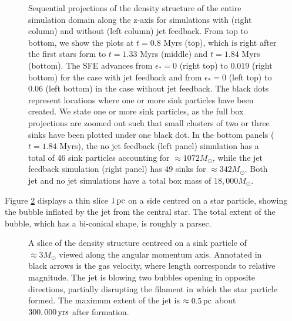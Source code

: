 \documentclass[../dissertation.tex]{subfiles}
\begin{document}
%
\begin{figure}[htb] %
  \caption[Jet - Jet No Jet Comparison]{Sequential projections of the density structure of the entire simulation domain along the z-axis for simulations with (right column) and without (left column) jet feedback.  From top to bottom, we show the plots at $t=0.8$ Myrs (top), which is right after the first stars form to $t=1.33$ Myrs (middle) and $t=1.84$ Myrs (bottom).  The SFE advances from $\epsilon_* = 0$ (right top) to $0.019$ (right bottom) for the case with jet feedback and from $\epsilon_* = 0$ (left top) to $0.06$ (left bottom) in the case without jet feedback. The black dots represent locations where one or more sink particles have been created. We state one or more sink particles, as the full box projections are zoomed out such that small clusters of two or three sinks have been plotted under one black dot. 
In the bottom panels ($t = 1.84$ Myrs), the no jet feedback (left panel) simulation has a total of 46 sink particles accounting for $\approx 1072 M_\odot$, while the jet feedback simulation (right panel) has 49 sinks for $\approx 342 M_\odot$. Both jet and no jet simulations have a total box mass of $18,000 M_\odot$.}
    \label{fig:jet_jet_panel}
\end{figure}
%

Figure \ref{fig:jet_jet_close_up} displays a thin slice $1\,{\rm pc}$ on a side centred on a star particle, showing the bubble inflated by the jet from the central star.
The total extent of the bubble, which has a bi-conical shape, is roughly a parsec.

%
\begin{figure}[htb] %
  \caption[Jet - Postage stamp of jet blown gas]{A slice of the density structure centreed on a sink particle of $\approx 3 M_\odot$ viewed along the angular momentum axis. Annotated in black arrows is the gas velocity, where length corresponds to relative magnitude. The jet is blowing two bubbles opening in opposite directions, partially disrupting the filament in which the star particle formed. The maximum extent of the jet is $\approx 0.5 \, {\rm pc}$ about $300,000 \, {\rm yrs}$ after formation.}
    \label{fig:jet_jet_close_up}
\end{figure}
%

\end{document}
